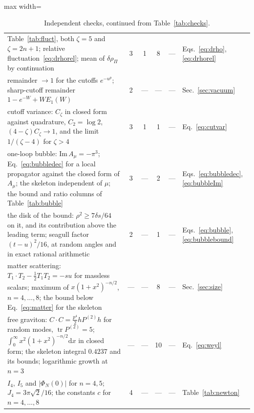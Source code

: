 \documentclass[a4paper,11pt]{article}
\newcommand{\dd}{\mathrm{d}}
\newcommand{\Pt}{P^{(2)}}
\begin{document}
\begin{table}[tp]
\begin{adjustbox}{max width=\linewidth}
\begin{tabular}{p{10.6cm}ccccl}
Table~\ref{tab:fluct}, both $\zeta=5$ and $\zeta=2n+1$; relative fluctuation~\eqref{eq:drhorel}; mean of $\delta\rho_\Pi$ by continuation & 3 & 1 & 8 & --- & Eqs.~\eqref{eq:drho}, \eqref{eq:drhorel}\\
remainder $\to1$ for the cutoffs $e^{-u^p}$; sharp-cutoff remainder $1-e^{-W}+WE_1(W)$ & 2 & --- & --- & --- & Sec.~\ref{sec:vacuum}\\
cutoff variance: $C_\zeta$ in closed form against quadrature, $C_2=\log2$, $(4-\zeta)C_\zeta\to1$, and the limit $1/(\zeta-4)$ for $\zeta>4$ & 3 & 1 & 1 & --- & Eq.~\eqref{eq:cutvar}\\
one-loop bubble: $\mathrm{Im}\,A_\mu=-\pi^3$; Eq.~\eqref{eq:bubbledec} for a local propagator against the closed form of $A_\mu$; the skeleton independent of $\mu$; the bound and ratio columns of Table~\ref{tab:bubble} & 3 & --- & 2 & --- & Eqs.~\eqref{eq:bubbledec}, \eqref{eq:bubbleIm}\\
the disk of the bound: $\rho^2\ge7\delta s/64$ on it, and its contribution above the leading term; seagull factor $(t-u)^2/16$, at random angles and in exact rational arithmetic & 2 & --- & 1 & --- & Eqs.~\eqref{eq:bubble}, \eqref{eq:bubblebound}\\
matter scattering: $T_1\!\cdot T_2-\frac12T_1T_2=-su$ for massless scalars; maximum of $x(1+x^2)^{-n/2}$, $n=4,\dots,8$; the bound below Eq.~\eqref{eq:matter} for the skeleton & --- & --- & 8 & --- & Sec.~\ref{sec:size}\\
free graviton: $C\cdot C=\frac{p^4}2h\Pt h$ for random modes, $\operatorname{tr}\Pt=5$; $\int_0^\infty x^2(1+x^2)^{-n/2}\dd x$ in closed form; the skeleton integral $0.4237$ and its bounds; logarithmic growth at $n=3$ & --- & --- & 10 & --- & Eq.~\eqref{eq:weyl}\\
$I_4$, $I_5$ and $|\Phi_N(0)|$ for $n=4,5$; $J_4=3\pi\sqrt2/16$; the constants $c$ for $n=4,\dots,8$ & 4 & --- & --- & --- & Table~\ref{tab:newton}\\
\hline\hline
\end{tabular}\end{adjustbox}
\caption{Independent checks, continued from Table~\ref{tab:checks}.}
\label{tab:checks2}
\end{table}
\end{document}
